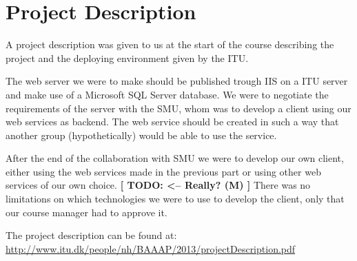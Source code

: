 \section{Project Description}
A project description was given to us at the start of the course describing the project and the deploying environment given by the ITU.

The web server we were to make should be published trough IIS on a ITU server and make use of a Microsoft SQL Server database.
We were to negotiate the requirements of the server with the SMU, whom was to develop a client using our web services as backend.
The web service should be created in such a way that another group  (hypothetically) would be able to use the service.

After the end of the collaboration with SMU we were to develop our own client, either using the web services made in the previous part or using other web services of our own choice. \textbf{[ TODO: <-- Really? (M) ]}
There was no limitations on which technologies we were to use to develop the client, only that our course manager had to approve it.

The project description can be found at: \url{http://www.itu.dk/people/nh/BAAAP/2013/projectDescription.pdf}
\newpage